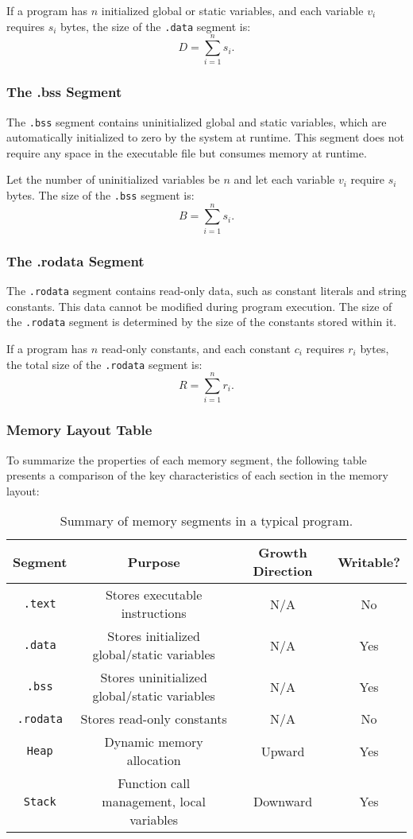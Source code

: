 If a program has $n$ initialized global or static variables, and each variable $v_i$ requires $s_i$ bytes, the size of the \texttt{.data} segment is:
\[
D = \sum_{i=1}^{n} s_i.
\]

\subsubsection{The .bss Segment}

The \texttt{.bss} segment contains uninitialized global and static variables, which are automatically initialized to zero by the system at runtime. This segment does not require any space in the executable file but consumes memory at runtime.

Let the number of uninitialized variables be $n$ and let each variable $v_i$ require $s_i$ bytes. The size of the \texttt{.bss} segment is:
\[
B = \sum_{i=1}^{n} s_i.
\]

\subsubsection{The .rodata Segment}

The \texttt{.rodata} segment contains read-only data, such as constant literals and string constants. This data cannot be modified during program execution. The size of the \texttt{.rodata} segment is determined by the size of the constants stored within it.

If a program has $n$ read-only constants, and each constant $c_i$ requires $r_i$ bytes, the total size of the \texttt{.rodata} segment is:
\[
R = \sum_{i=1}^{n} r_i.
\]

\subsubsection{Memory Layout Table}

To summarize the properties of each memory segment, the following table presents a comparison of the key characteristics of each section in the memory layout:

\begin{table}[h]
	\centering
	\begin{tabular}{|c|c|c|c|}
		\hline
		\textbf{Segment} & \textbf{Purpose} & \textbf{Growth Direction} & \textbf{Writable?} \\ \hline
		\texttt{.text}   & Stores executable instructions & N/A  & No \\ \hline
		\texttt{.data}   & Stores initialized global/static variables & N/A  & Yes \\ \hline
		\texttt{.bss}    & Stores uninitialized global/static variables & N/A  & Yes \\ \hline
		\texttt{.rodata} & Stores read-only constants & N/A  & No \\ \hline
		\texttt{Heap}    & Dynamic memory allocation & Upward & Yes \\ \hline
		\texttt{Stack}   & Function call management, local variables & Downward & Yes \\ \hline
	\end{tabular}
	\caption{Summary of memory segments in a typical program.}
\end{table}

